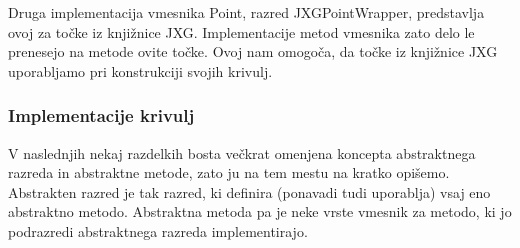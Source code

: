 \documentclass[isrm2, tisk]{fmfdelo}
\begin{document}
    Druga implementacija vmesnika Point, razred JXGPointWrapper, predstavlja ovoj za točke iz knjižnice JXG.
    Implementacije metod vmesnika zato delo le prenesejo na metode ovite točke.
    Ovoj nam omogoča, da točke iz knjižnice JXG uporabljamo pri konstrukciji svojih krivulj.

    \subsubsection{Implementacije krivulj}
    V naslednjih nekaj razdelkih bosta večkrat omenjena koncepta abstraktnega razreda in abstraktne metode, zato ju na tem mestu na kratko opišemo.
    Abstrakten razred je tak razred, ki definira (ponavadi tudi uporablja) vsaj eno abstraktno metodo.
    Abstraktna metoda pa je neke vrste vmesnik za metodo, ki jo podrazredi abstraktnega razreda implementirajo.
\end{document}
